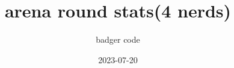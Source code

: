 \documentclass[12pt]{article}
\begin{document}
	\pagestyle{fancy}
	\fancyfoot[LE,RO]{\thepage}

	\title{arena round stats(4 nerds)}
	\author{badger code}
	\date{2023-07-20}

	\maketitle

	\newcommand{\playerHealthMax}{100}
	\newcommand{\playerDamage}{10}

	\newcommand{\note}[2]{
		\underset{\text{#2}}{\underbrace{#1}}
	}
	\newcommand{\improvement}[1]{
		\sum_{a=#1}^{a}((\note{20}{health multiplier} \times \note{a}{round})+\note{\playerHealthMax}{player.health\_max})+
		\sum_{a=#1}^{a}((\note{10}{damage multiplier} \times a)+\note{\playerDamage}{player.damage})
	}
	\newcommand{\adversity}[1]{
		\sum_{a=#1}^{a}((\note{156.1}{\text{health multiplier}} \times \note{a}{round})+\note{-214}{\text{health constant}})+
		\sum_{a=#1}^{a}((\note{14}{\text{damage multiplier}} \times a)+\note{-6.857}{\text{damage constant}})
	}
	\newcommand{\improvementz}[1]{
		((20*#1)+\playerHealthMax)+
		((10*#1)+\playerDamage)
	}
	\newcommand{\adversityz}[1]{
		((156.1*#1)-214)+
		((14*#1)-6.857)
	}
\end{document}
